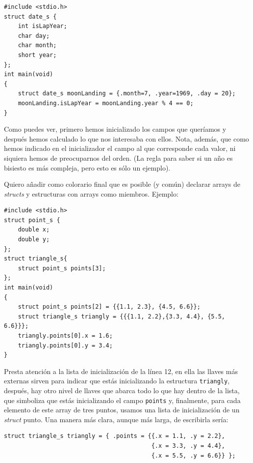 \documentclass[a4paper]{article}
\begin{document}
\noindent
\begin{minipage}[H]{\linewidth}
\mbox{}
\begin{lstlisting}[style=C,
caption={Inicialización con llaves de struct con selección de campos},
label={lst:dateStruct}]
#include <stdio.h>
struct date_s {
    int isLapYear;
    char day;
    char month;
    short year;
};
int main(void)
{
    struct date_s moonLanding = {.month=7, .year=1969, .day = 20};
    moonLanding.isLapYear = moonLanding.year % 4 == 0;
}
\end{lstlisting}
\end{minipage}


Como puedes ver, primero hemos inicializado los campos que queríamos y después
hemos calculado lo que nos interesaba con ellos. Nota, además, que como hemos
indicado en el inicializador el campo al que corresponde cada valor, ni siquiera
hemos de preocuparnos del orden.
(La regla para saber si un año
es bisiesto es más compleja, pero esto es sólo un ejemplo).

Quiero añadir como colorario final que es posible (y común) declarar arrays de
\textit{structs} y estructuras con arrays como miembros. Ejemplo:


\noindent
\begin{minipage}[H]{\linewidth}
\mbox{}
\begin{lstlisting}[style=C,
caption={Combinación \textit{struct} con array},
label={lst:exampleArrayStruct}]
#include <stdio.h>
struct point_s {
    double x;
    double y;
};
struct triangle_s{
    struct point_s points[3];
};
int main(void)
{
    struct point_s points[2] = {{1.1, 2.3}, {4.5, 6.6}};
    struct triangle_s triangly = {{{1.1, 2.2},{3.3, 4.4}, {5.5, 6.6}}};
    triangly.points[0].x = 1.6;
    triangly.points[0].y = 3.4;
}
\end{lstlisting}
\end{minipage}

Presta atención a la lista de inicialización de la línea 12, en ella las llaves
más externas sirven para indicar que estás inicializando la estructura
\verb!triangly!, después, hay otro nivel de llaves que abarca todo lo que hay
dentro de la lista, que simboliza que estás inicializando el campo
\verb!points! y, finalmente, para cada elemento de este array de tres puntos,
usamos una lista de inicialización de un \emph{struct} punto. Una manera más
clara, aunque más larga, de escribirla sería:

\noindent
\begin{minipage}[H]{\linewidth}
\begin{lstlisting}[style=C]
struct triangle_s triangly = { .points = {{.x = 1.1, .y = 2.2},
                                          {.x = 3.3, .y = 4.4},
                                          {.x = 5.5, .y = 6.6}} };
\end{lstlisting}
\end{minipage}
\end{document}
